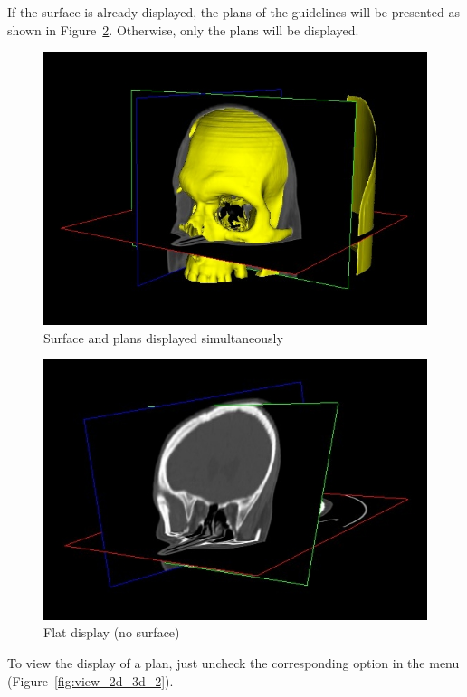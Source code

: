 \newpage

If the surface is already displayed, the plans of the guidelines will be presented as shown in Figure~\ref{fig:only_2d_planes}. Otherwise, only the plans will be displayed.

\begin{figure}[!htb]
\centering
\includegraphics[scale=0.5]{../user_guide_figures/invesalius_screen/3d_planes.jpg}
\caption{Surface and plans displayed simultaneously}
\label{fig:3d_planes}
\end{figure}

\begin{figure}[!htb]
\centering
\includegraphics[scale=0.55]{../user_guide_figures/invesalius_screen/only_2d_planes.jpg}
\caption{Flat display (no surface)}
\label{fig:only_2d_planes}
\end{figure}

\newpage

To view the display of a plan, just uncheck the corresponding option in the menu (Figure~\ref{fig:view_2d_3d_2}).